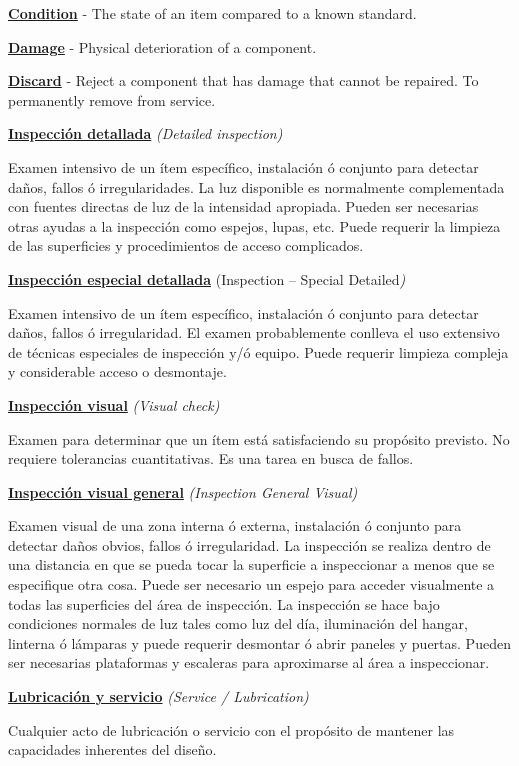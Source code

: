 \documentclass[
]{article}
\begin{document}
\textbf{\ul{Condition}} - The state of an item compared to a known
standard.

\textbf{\ul{Damage}} - Physical deterioration of a component.

\textbf{\ul{Discard}} - Reject a component that has damage that cannot
be repaired. To permanently remove from service.

\textbf{\ul{Inspección detallada}} \emph{(Detailed inspection)}

Examen intensivo de un ítem específico, instalación ó conjunto para
detectar daños, fallos ó irregularidades. La luz disponible es
normalmente complementada con fuentes directas de luz de la intensidad
apropiada. Pueden ser necesarias otras ayudas a la inspección como
espejos, lupas, etc. Puede requerir la limpieza de las superficies y
procedimientos de acceso complicados.

\textbf{\ul{Inspección especial detallada}} (Inspection -- Special
Detailed\emph{)}

Examen intensivo de un ítem específico, instalación ó conjunto para
detectar daños, fallos ó irregularidad. El examen probablemente conlleva
el uso extensivo de técnicas especiales de inspección y/ó equipo. Puede
requerir limpieza compleja y considerable acceso o desmontaje.

\textbf{\ul{Inspección visual}} \emph{(Visual check)}

Examen para determinar que un ítem está satisfaciendo su propósito
previsto. No requiere tolerancias cuantitativas. Es una tarea en busca
de fallos.

\textbf{\ul{Inspección visual general}} \emph{(Inspection General
Visual)}

Examen visual de una zona interna ó externa, instalación ó conjunto para
detectar daños obvios, fallos ó irregularidad. La inspección se realiza
dentro de una distancia en que se pueda tocar la superficie a
inspeccionar a menos que se especifique otra cosa. Puede ser necesario
un espejo para acceder visualmente a todas las superficies del área de
inspección. La inspección se hace bajo condiciones normales de luz tales
como luz del día, iluminación del hangar, linterna ó lámparas y puede
requerir desmontar ó abrir paneles y puertas. Pueden ser necesarias
plataformas y escaleras para aproximarse al área a inspeccionar.

\textbf{\ul{Lubricación y servicio}} \emph{(Service / Lubrication)}

Cualquier acto de lubricación o servicio con el propósito de mantener
las capacidades inherentes del diseño.
\end{document}
